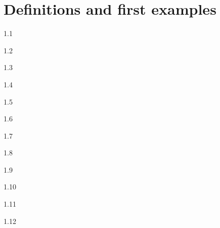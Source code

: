 \chapter{Definitions and first examples}

\begin{solution}{}{1.1}
    
\end{solution}

\begin{solution}{}{1.2}

\end{solution}

\begin{solution}{}{1.3}
    
\end{solution}

\begin{solution}{}{1.4}

\end{solution}

\begin{solution}{}{1.5}
    
\end{solution}

\begin{solution}{}{1.6}

\end{solution}

\begin{solution}{}{1.7}
    
\end{solution}

\begin{solution}{}{1.8}

\end{solution}

\begin{solution}{}{1.9}
    
\end{solution}

\begin{solution}{}{1.10}

\end{solution}

\begin{solution}{}{1.11}
    
\end{solution}

\begin{solution}{}{1.12}

\end{solution}